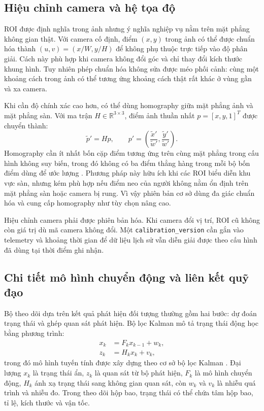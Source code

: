 \subsection{Hiệu chỉnh camera và hệ tọa độ}
ROI được định nghĩa trong ảnh nhưng ý nghĩa nghiệp vụ nằm trên mặt phẳng không gian thật. Với camera cố định, điểm $(x,y)$ trong ảnh có thể được chuẩn hóa thành $(u,v)=(x/W,y/H)$ để không phụ thuộc trực tiếp vào độ phân giải. Cách này phù hợp khi camera không đổi góc và chỉ thay đổi kích thước khung hình. Tuy nhiên phép chuẩn hóa không sửa được méo phối cảnh: cùng một khoảng cách trong ảnh có thể tương ứng khoảng cách thật rất khác ở vùng gần và xa camera.

Khi cần độ chính xác cao hơn, có thể dùng homography giữa mặt phẳng ảnh và mặt phẳng sàn. Với ma trận $H\in\mathbb{R}^{3\times3}$, điểm ảnh thuần nhất $p=[x,y,1]^T$ được chuyển thành:
\begin{equation}
 \tilde{p}'=Hp,\qquad p'=\left(\frac{\tilde{x}'}{\tilde{w}'},\frac{\tilde{y}'}{\tilde{w}'}\right).
\end{equation}
Homography cần ít nhất bốn cặp điểm tương ứng trên cùng mặt phẳng trong cấu hình không suy biến, trong đó không có ba điểm thẳng hàng trong mỗi bộ bốn điểm dùng để ước lượng \cite{opencvhomography}. Phương pháp này hữu ích khi các ROI biểu diễn khu vực sàn, nhưng kém phù hợp nếu điểm neo của người không nằm ổn định trên mặt phẳng sàn hoặc camera bị rung. Vì vậy phiên bản cơ sở dùng đa giác chuẩn hóa và cung cấp homography như tùy chọn nâng cao.

Hiệu chỉnh camera phải được phiên bản hóa. Khi camera đổi vị trí, ROI cũ không còn giá trị dù mã camera không đổi. Một \texttt{calibration\_version} cần gắn vào telemetry và khoảng thời gian để dữ liệu lịch sử vẫn diễn giải được theo cấu hình đã dùng tại thời điểm ghi nhận.

\subsection{Chi tiết mô hình chuyển động và liên kết quỹ đạo}
Bộ theo dõi dựa trên kết quả phát hiện đối tượng thường gồm hai bước: dự đoán trạng thái và ghép quan sát phát hiện. Bộ lọc Kalman mô tả trạng thái động học bằng phương trình:
\begin{align}
 x_k &= F_kx_{k-1}+w_k,\\
 z_k &= H_kx_k+v_k,
\end{align}
trong đó mô hình tuyến tính được xây dựng theo cơ sở bộ lọc Kalman \cite{kalman}. Đại lượng $x_k$ là trạng thái ẩn, $z_k$ là quan sát từ bộ phát hiện, $F_k$ là mô hình chuyển động, $H_k$ ánh xạ trạng thái sang không gian quan sát, còn $w_k$ và $v_k$ là nhiễu quá trình và nhiễu đo. Trong theo dõi hộp bao, trạng thái có thể chứa tâm hộp bao, tỉ lệ, kích thước và vận tốc.

